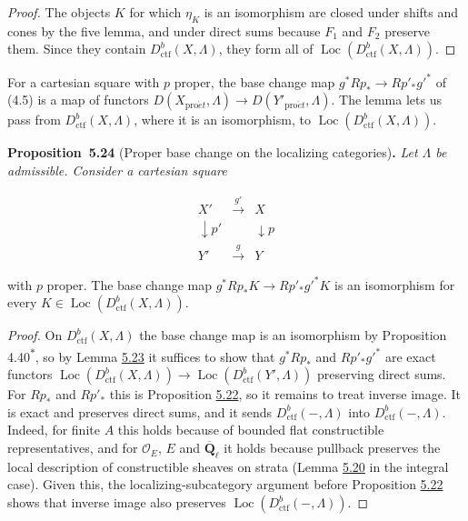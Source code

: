 \documentclass[11pt]{article}
\newenvironment{bpstatement}[2]{\par\addvspace{0.6\baselineskip}\noindent\textbf{#1}#2\textbf{.}\enspace\ignorespaces}
  {\par\addvspace{0.4\baselineskip}}
\newenvironment{bpstatementit}[2]{\begin{bpstatement}{#1}{#2}\itshape\ignorespaces}{\end{bpstatement}}
\newcommand{\bpout}[1]{#1\textsuperscript{\hyperlink{bp-outside}{\ensuremath{\ast}}}}
\providecommand{\Loc}{}\renewcommand{\Loc}{\operatorname{Loc}}
\begin{document}
\begin{proof}[{Proof}]\label{bp80}%
The objects \(K\) for which \(\eta_K\) is an isomorphism are closed under shifts and cones by the five lemma, and under direct sums because \(F_1\) and \(F_2\) preserve them. Since they contain \(D^b_{\mathrm{ctf}}(X,\Lambda)\), they form all of \(\Loc(D^b_{\mathrm{ctf}}(X,\Lambda))\).
\end{proof}

\label{bp81}%
For a cartesian square with \(p\) proper, the base change map \(g^*Rp_*\to Rp'_*g'^*\) of (4.5) is a map of functors \(D(X_{\mathrm{pro}\acute{e}t},\Lambda)\to D(Y'_{\mathrm{pro}\acute{e}t},\Lambda)\). The lemma lets us pass from \(D^b_{\mathrm{ctf}}(X,\Lambda)\), where it is an isomorphism, to \(\Loc(D^b_{\mathrm{ctf}}(X,\Lambda))\).

\label{bp82}%
\begin{bpstatementit}{Proposition~5.24}{ (Proper base change on the localizing categories)}
Let \(\Lambda\) be admissible. Consider a cartesian square

\[
\begin{array}{ccc}
X'&\xrightarrow{g'}&X\\
\downarrow p'&&\downarrow p\\
Y'&\xrightarrow{g}&Y
\end{array}
\]

with \(p\) proper. The base change map \(g^*Rp_*K\to Rp'_*g'^*K\) is an isomorphism for every \(K\in\Loc(D^b_{\mathrm{ctf}}(X,\Lambda))\).
\end{bpstatementit}

\begin{proof}[{Proof}]\label{bp83}%
On \(D^b_{\mathrm{ctf}}(X,\Lambda)\) the base change map is an isomorphism by Proposition \bpout{4.40}, so by Lemma \hyperref[bp79]{5.23} it suffices to show that \(g^*Rp_*\) and \(Rp'_*g'^*\) are exact functors \(\Loc(D^b_{\mathrm{ctf}}(X,\Lambda))\to\Loc(D^b_{\mathrm{ctf}}(Y',\Lambda))\) preserving direct sums. For \(Rp_*\) and \(Rp'_*\) this is Proposition \hyperref[bp76]{5.22}, so it remains to treat inverse image. It is exact and preserves direct sums, and it sends \(D^b_{\mathrm{ctf}}(-,\Lambda)\) into \(D^b_{\mathrm{ctf}}(-,\Lambda)\). Indeed, for finite \(A\) this holds because of bounded flat constructible representatives, and for \(\mathcal O_E\), \(E\) and \(\overline{\mathbf Q}_\ell\) it holds because pullback preserves the local description of constructible sheaves on strata (Lemma \hyperref[bp68]{5.20} in the integral case). Given this, the localizing-subcategory argument before Proposition \hyperref[bp76]{5.22} shows that inverse image also preserves \(\Loc(D^b_{\mathrm{ctf}}(-,\Lambda))\).
\end{proof}
\end{document}

